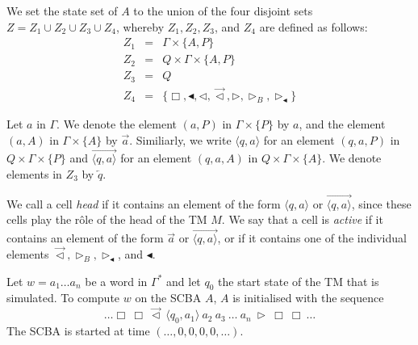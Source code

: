 \documentclass[pre,amssymb,showpacs,showkeys,preprint]{revtex4}
\begin{document}
We set the state set of $A$ to the union of the four disjoint sets
$Z = Z_1 \cup Z_2 \cup Z_3 \cup Z_4$, whereby $Z_1, Z_2, Z_3$, and $Z_4$ are defined as follows:
\begin{eqnarray*}
Z_1 & = & \Gamma \times \{A, P\} \\
Z_2 & = & Q \times \Gamma \times \{A ,P\} \\
Z_3 & = & Q \\
Z_4 &= & \{\Box, \blacktriangleleft, \lhd, \vec{\lhd}, \rhd, \rhd_B, \rhd_\blacktriangleleft\}
\end{eqnarray*}

Let $a$ in $\Gamma$.
We denote the element $(a, P)$ in $\Gamma \times \{P\}$ by $a$, and the element $(a, A)$ in
$\Gamma \times \{A\}$ by $\overrightarrow{a}$.
Similiarly, we write $\langle q, a \rangle$ for an element $(q, a, P)$ in
$Q \times \Gamma \times \{P\}$ and $\overrightarrow{\langle q, a \rangle}$ for an element
$(q, a, A)$ in $Q \times \Gamma \times \{A\}$.
We denote elements in $Z_3$ by $\overleftarrow{q}$.

We call a cell \emph{head} if it contains an element of the form $\langle q, a \rangle$ or
 $\overrightarrow{\langle q, a \rangle}$,
 since these cells play the r\^{o}le of the head of the TM $M$.
We say that a cell is \emph{active} if it contains an element of the form $\overrightarrow{a}$ or
$\overrightarrow{\langle q, a \rangle}$,
or if it contains one of the individual elements $\vec{\lhd}, \rhd_B, \rhd_\blacktriangleleft$, and
$\blacktriangleleft$.

Let $w=a_1 \ldots a_n$ be a word in $\Gamma^*$ and let $q_0$ the start state of the TM that is
simulated.
To compute $w$ on the SCBA $A$, $A$ is initialised with the sequence
\[
\ldots \Box \: \Box \: \overrightarrow{\lhd} \: \langle q_0,a_1 \rangle \: a_2 \: a_3
\: \ldots \: a_n \: \rhd \: \Box \: \Box \: \ldots
\]
The SCBA is started at time $(\ldots, 0, 0, 0, 0, \ldots)$.
\end{document}
